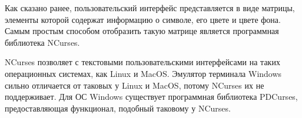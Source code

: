 Как сказано ранее, пользовательский интерфейс представляется в виде матрицы, элементы которой содержат информацию о символе, его цвете и цвете фона.
Самым простым способом отобразить такую матрице является программная библиотека NCurses.

NCurses позволяет с текстовыми пользовательскими интерфейсами на таких операционных системах, как Linux и MacOS.
Эмулятор терминала Windows сильно отличается от таковых у Linux и MacOS, потому NCurses их не поддерживает.
Для ОС Windows существует программная библиотека PDCurses, предоставляющая функционал, подобный таковому у NCurses.
